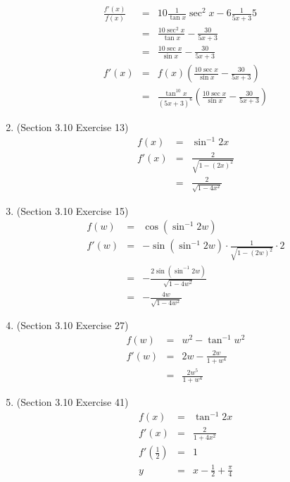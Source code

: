 \documentclass{article}
\begin{document}
\begin{enumerate}
\begin{eqnarray}
            \frac{f'(x)}{f(x)} &=& 10\frac{1}{\tan{x}}\sec^2{x} - 6\frac{1}{5x + 3}5 \\
                               &=& \frac{10\sec^2{x}}{\tan{x}} - \frac{30}{5x + 3} \\
                               &=& \frac{10\sec{x}}{\sin{x}} - \frac{30}{5x + 3} \\
            f'(x) &=& f(x)\left(\frac{10\sec{x}}{\sin{x}} - \frac{30}{5x + 3}\right) \\
                  &=& \frac{\tan^{10}x}{\left(5x + 3\right)^6}\left(\frac{10\sec{x}}{\sin{x}} - \frac{30}{5x + 3}\right)
        \end{eqnarray}
    \item (Section 3.10 Exercise 13)
        \begin{eqnarray}
            f(x) &=& \sin^{-1}{2x} \\
            f'(x) &=& \frac{2}{\sqrt{1 - \left(2x\right)^2}} \\
                  &=& \frac{2}{\sqrt{1 - 4x^2}}
        \end{eqnarray}
    \item (Section 3.10 Exercise 15)
        \begin{eqnarray}
            f(w) &=& \cos{\left(\sin^{-1}{2w}\right)} \\
            f'(w) &=& -\sin{\left(\sin^{-1}{2w}\right)} \cdot \frac{1}{\sqrt{1 - \left(2w\right)^2}} \cdot 2 \\
                  &=& - \frac{2\sin{\left(\sin^{-1}{2w}\right)}}{\sqrt{1 - 4w^2}} \\
                  &=& - \frac{4w}{\sqrt{1 - 4w^2}}
        \end{eqnarray}
    \item (Section 3.10 Exercise 27)
        \begin{eqnarray}
            f(w) &=& w^2 - \tan^{-1}{w^2} \\
            f'(w) &=& 2w - \frac{2w}{1 + w^4} \\
                  &=& \frac{2w^5}{1 + w^4}
        \end{eqnarray}
    \item (Section 3.10 Exercise 41)
        \begin{eqnarray}
            f(x) &=& \tan^{-1}{2x} \\
            f'(x) &=& \frac{2}{1 + 4x^2} \\
            f'\left(\frac{1}{2}\right) &=& 1 \\
            y &=& x - \frac{1}{2} + \frac{\pi}{4}

\end{eqnarray}
\end{enumerate}
\end{document}

